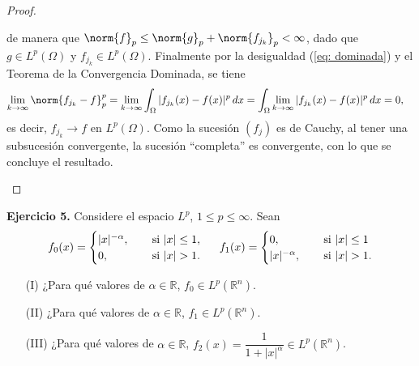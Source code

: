 \begin{proof}
\begin{itemize}
        de manera que $\norm{f}_p\leq \norm{g}_p+\norm{f_{j_k}}_p<\infty$, dado que $g \in L^p(\Omega)$ y $f_{j_k}\in L^p(\Omega)$. Finalmente por la desigualdad (\ref{eq: dominada}) y el Teorema de la Convergencia Dominada, se tiene
        \begin{align*}
            \lim_{k\to \infty}\norm{f_{j_k}-f}_p^p=\lim_{k\to \infty}\int_{\Omega}|f_{j_k}(x)-f(x)|^p\, dx&=\int_{\Omega}\lim_{k\to \infty}|f_{j_k}(x)-f(x)|^p\, dx=0,
        \end{align*}
        es decir, $f_{j_k}\to f$ en $L^p(\Omega)$. Como la sucesión $(f_j)$ es de Cauchy, al tener una subsucesión convergente, la sucesión ``completa'' es convergente, con lo que se concluye el resultado.
     \end{itemize}
\end{proof}




\textbf{Ejercicio 5.} Considere el espacio $L^p$, $1\leq p\leq \infty$. Sean
\begin{align*}
    f_0(x)=\begin{cases}
        |x|^{-\alpha}, \hspace{3mm} &\text{ si } |x|\leq 1,\\
        0, \hspace{3mm} &\text{ si } |x|>1.
    \end{cases} \hspace{5mm} f_1(x)=\begin{cases}
        0, \hspace{3mm} &\text{ si } |x|\leq 1\\
        |x|^{-\alpha}, \hspace{3mm} &\text{ si } |x|>1.
    \end{cases}
\end{align*}
\begin{enumerate}
    \item[(I)] ¿Para qué valores de $\alpha\in \mathbb{R}$, $f_0\in L^p(\mathbb{R}^n)$.
    \item[(II)] ¿Para qué valores de $\alpha\in \mathbb{R}$, $f_1\in L^p(\mathbb{R}^n)$.
    \item[(III)] ¿Para qué valores de $\alpha\in \mathbb{R}$, $f_2(x)=\dfrac{1}{1+|x|^\alpha}\in L^p(\mathbb{R}^n)$.
\end{enumerate}

